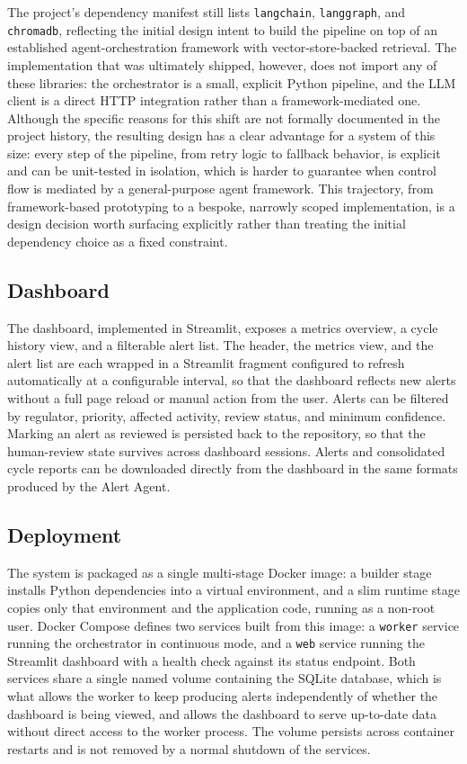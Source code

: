 \documentclass[conference]{IEEEtran}
\begin{document}
The project's dependency manifest still lists \texttt{langchain}, \texttt{langgraph}, and \texttt{chromadb}, reflecting the initial design intent to build the pipeline on top of an established agent-orchestration framework with vector-store-backed retrieval. The implementation that was ultimately shipped, however, does not import any of these libraries: the orchestrator is a small, explicit Python pipeline, and the LLM client is a direct HTTP integration rather than a framework-mediated one. Although the specific reasons for this shift are not formally documented in the project history, the resulting design has a clear advantage for a system of this size: every step of the pipeline, from retry logic to fallback behavior, is explicit and can be unit-tested in isolation, which is harder to guarantee when control flow is mediated by a general-purpose agent framework. This trajectory, from framework-based prototyping to a bespoke, narrowly scoped implementation, is a design decision worth surfacing explicitly rather than treating the initial dependency choice as a fixed constraint.

\subsection{Dashboard}

The dashboard, implemented in Streamlit, exposes a metrics overview, a cycle history view, and a filterable alert list. The header, the metrics view, and the alert list are each wrapped in a Streamlit fragment configured to refresh automatically at a configurable interval, so that the dashboard reflects new alerts without a full page reload or manual action from the user. Alerts can be filtered by regulator, priority, affected activity, review status, and minimum confidence. Marking an alert as reviewed is persisted back to the repository, so that the human-review state survives across dashboard sessions. Alerts and consolidated cycle reports can be downloaded directly from the dashboard in the same formats produced by the Alert Agent.

\subsection{Deployment}

The system is packaged as a single multi-stage Docker image: a builder stage installs Python dependencies into a virtual environment, and a slim runtime stage copies only that environment and the application code, running as a non-root user. Docker Compose defines two services built from this image: a \texttt{worker} service running the orchestrator in continuous mode, and a \texttt{web} service running the Streamlit dashboard with a health check against its status endpoint. Both services share a single named volume containing the SQLite database, which is what allows the worker to keep producing alerts independently of whether the dashboard is being viewed, and allows the dashboard to serve up-to-date data without direct access to the worker process. The volume persists across container restarts and is not removed by a normal shutdown of the services.
\end{document}
